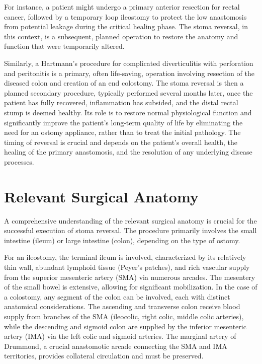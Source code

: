 For instance, a patient might undergo a primary anterior resection for rectal cancer, followed by a temporary loop ileostomy to protect the low anastomosis from potential leakage during the critical healing phase. The stoma reversal, in this context, is a subsequent, planned operation to restore the anatomy and function that were temporarily altered.

Similarly, a Hartmann's procedure for complicated diverticulitis with perforation and peritonitis is a primary, often life-saving, operation involving resection of the diseased colon and creation of an end colostomy. The stoma reversal is then a planned secondary procedure, typically performed several months later, once the patient has fully recovered, inflammation has subsided, and the distal rectal stump is deemed healthy. Its role is to restore normal physiological function and significantly improve the patient's long-term quality of life by eliminating the need for an ostomy appliance, rather than to treat the initial pathology. The timing of reversal is crucial and depends on the patient's overall health, the healing of the primary anastomosis, and the resolution of any underlying disease processes.

\section*{Relevant Surgical Anatomy}
A comprehensive understanding of the relevant surgical anatomy is crucial for the successful execution of stoma reversal. The procedure primarily involves the small intestine (ileum) or large intestine (colon), depending on the type of ostomy. 

For an ileostomy, the terminal ileum is involved, characterized by its relatively thin wall, abundant lymphoid tissue (Peyer's patches), and rich vascular supply from the superior mesenteric artery (SMA) via numerous arcades. The mesentery of the small bowel is extensive, allowing for significant mobilization. In the case of a colostomy, any segment of the colon can be involved, each with distinct anatomical considerations. The ascending and transverse colon receive blood supply from branches of the SMA (ileocolic, right colic, middle colic arteries), while the descending and sigmoid colon are supplied by the inferior mesenteric artery (IMA) via the left colic and sigmoid arteries. The marginal artery of Drummond, a crucial anastomotic arcade connecting the SMA and IMA territories, provides collateral circulation and must be preserved.

